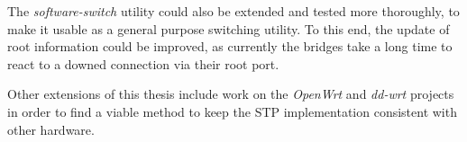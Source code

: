 The \textit{software-switch} utility could also be extended and tested more thoroughly, to make it usable as a general purpose switching utility.
To this end, the update of root information could be improved, as currently the bridges take a long time to react to a downed connection via their root port.

Other extensions of this thesis include work on the \textit{OpenWrt} and \textit{dd-wrt} projects in order to find a viable method to keep the STP implementation consistent with other hardware.
